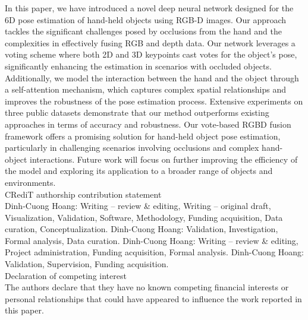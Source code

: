 In this paper, we have introduced a novel deep neural network designed for the 6D pose estimation of hand-held objects using RGB-D images. Our approach tackles the significant challenges posed by occlusions from the hand and the complexities in effectively fusing RGB and depth data.  Our network leverages a voting scheme where both 2D and 3D keypoints cast votes for the object’s pose, significantly enhancing the estimation in scenarios with occluded objects. Additionally, we model the interaction between the hand and the object through a self-attention mechanism, which captures complex spatial relationships and improves the robustness of the pose estimation process. Extensive experiments on three public datasets demonstrate that our method outperforms existing approaches in terms of accuracy and robustness. Our vote-based RGBD fusion framework offers a promising solution for hand-held object pose estimation, particularly in challenging scenarios involving occlusions and complex hand-object interactions. Future work will focus on further improving the efficiency of the model and exploring its application to a broader range of objects and environments. \\

CRediT authorship contribution statement \\
Dinh-Cuong Hoang: Writing – review \& editing, Writing – original draft, Visualization, Validation, Software, Methodology, Funding acquisition, Data curation, Conceptualization. Dinh-Cuong Hoang: Validation, Investigation, Formal analysis, Data curation. Dinh-Cuong Hoang: Writing – review \& editing, Project administration, Funding acquisition, Formal analysis. Dinh-Cuong Hoang: Validation, Supervision, Funding acquisition. \\ 

Declaration of competing interest \\
The authors declare that they have no known competing financial interests or personal relationships that could have appeared to influence the work reported in this paper.